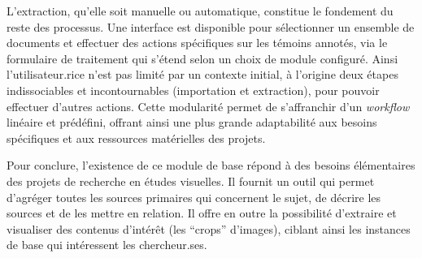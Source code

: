 L'extraction, qu'elle soit manuelle ou automatique, constitue le
fondement du reste des processus. Une interface est disponible pour
sélectionner un ensemble de documents et effectuer des actions
spécifiques sur les témoins annotés, via le formulaire de traitement qui
s'étend selon un choix de module configuré. Ainsi l'utilisateur.rice n'est
pas limité par un contexte initial, à l'origine deux étapes
indissociables et incontournables (importation et extraction), pour
pouvoir effectuer d'autres actions. Cette modularité permet de
s'affranchir d'un \textit{workflow} linéaire et prédéfini, offrant ainsi une plus
grande adaptabilité aux besoins spécifiques et aux ressources
matérielles des projets.

Pour conclure, l'existence de ce module de base répond à des besoins
élémentaires des projets de recherche en études visuelles. Il fournit un
outil qui permet d'agréger toutes les sources primaires qui concernent
le sujet, de décrire les sources et de les mettre en relation. Il offre
en outre la possibilité d'extraire et visualiser des contenus d'intérêt
(les ``crops'' d'images), ciblant ainsi les instances de base qui
intéressent les chercheur.ses.